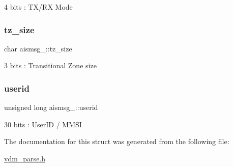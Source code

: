 4 bits \+: T\+X/\+RX Mode 

\mbox{\label{structaismsg__22_a39eaf2f56d7b224ea3254b3b4674e56d}} 
\subsubsection{\texorpdfstring{tz\+\_\+size}{tz\_size}}
{\footnotesize\ttfamily char aismsg\+\_\+::tz\+\_\+size}



3 bits \+: Transitional Zone size 

\mbox{\label{structaismsg__22_a171e90386762b51830a5c27f1c8df835}} 
\subsubsection{\texorpdfstring{userid}{userid}}
{\footnotesize\ttfamily unsigned long aismsg\+\_\+::userid}



30 bits \+: User\+ID / M\+M\+SI 



The documentation for this struct was generated from the following file\+:\begin{DoxyCompactItemize}
\item 
\mbox{\hyperlink{vdm__parse_8h}{vdm\+\_\+parse.\+h}}\end{DoxyCompactItemize}
